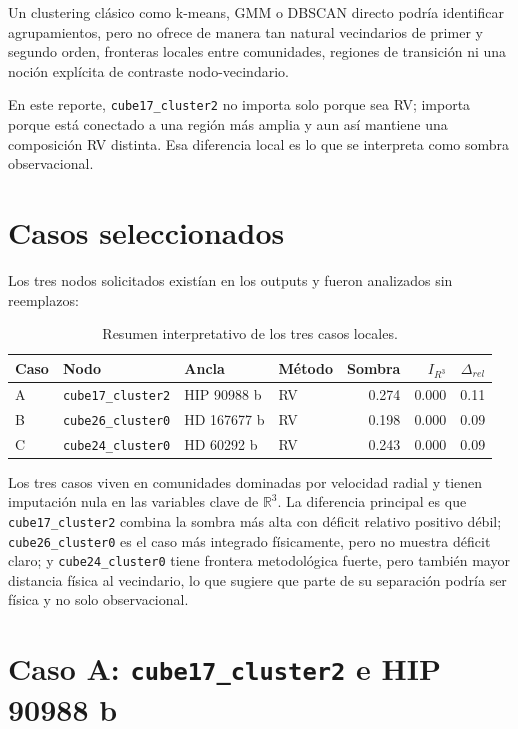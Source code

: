 \documentclass[11pt]{article}
\begin{document}
Un clustering clásico como k-means, GMM o DBSCAN directo podría identificar agrupamientos, pero no ofrece de manera tan natural vecindarios de primer y segundo orden, fronteras locales entre comunidades, regiones de transición ni una noción explícita de contraste nodo-vecindario.

En este reporte, \texttt{cube17\_cluster2} no importa solo porque sea RV; importa porque está conectado a una región más amplia y aun así mantiene una composición RV distinta. Esa diferencia local es lo que se interpreta como sombra observacional.


\section{Casos seleccionados}

Los tres nodos solicitados existían en los outputs y fueron analizados sin reemplazos:

\begin{table}[H]
\centering
\caption{Resumen interpretativo de los tres casos locales.}
\label{tab:threecases}
\begin{tabular}{llllrrr}
\toprule
Caso & Nodo & Ancla & Método & Sombra & $I_{R^3}$ & $\Delta_{rel}$ \\
\midrule
A & \texttt{cube17\_cluster2} & HIP 90988 b & RV & 0.274 & 0.000 & 0.11 \\
B & \texttt{cube26\_cluster0} & HD 167677 b & RV & 0.198 & 0.000 & 0.09 \\
C & \texttt{cube24\_cluster0} & HD 60292 b & RV & 0.243 & 0.000 & 0.09 \\
\bottomrule
\end{tabular}
\end{table}

Los tres casos viven en comunidades dominadas por velocidad radial y tienen imputación nula en las variables clave de $\mathbb{R}^3$. La diferencia principal es que \texttt{cube17\_cluster2} combina la sombra más alta con déficit relativo positivo débil; \texttt{cube26\_cluster0} es el caso más integrado físicamente, pero no muestra déficit claro; y \texttt{cube24\_cluster0} tiene frontera metodológica fuerte, pero también mayor distancia física al vecindario, lo que sugiere que parte de su separación podría ser física y no solo observacional.

\section{Caso A: \texttt{cube17\_cluster2} e HIP 90988 b}
\end{document}
